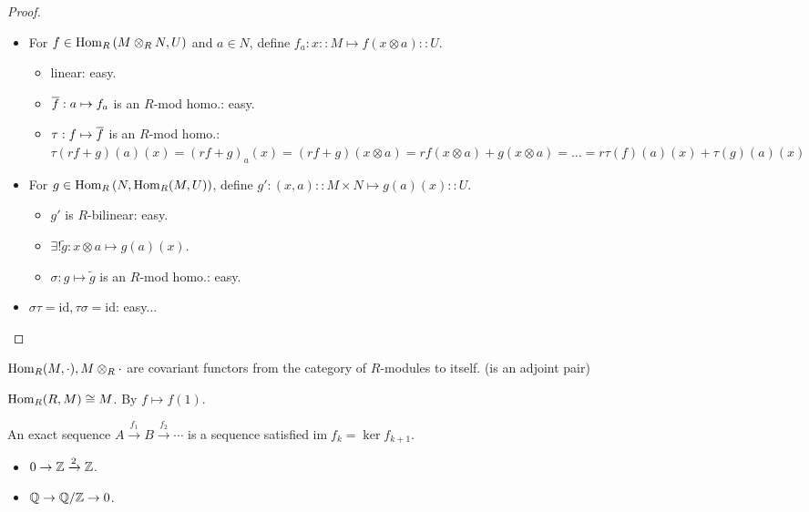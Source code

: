 \begin{proof} \mbox{}
  \begin{itemize}
    \item For $f \in \operatorname{Hom}_R\left(M \otimes_R N, U\right)$ and $a \in N$,
      define $f_a: x :: M \mapsto f(x \otimes a) :: U$.
      \begin{itemize}
        \item linear: easy.
        \item $\overline{f}: a \mapsto f_a$ is an $R$-mod homo.: easy.
        \item $\tau: f \mapsto \overline{f}$ is an $R$-mod homo.:
          $\tau(rf+g)(a)(x) = (rf+g)_a(x) = (rf+g)(x\otimes a)
          = rf(x\otimes a) + g(x\otimes a) = \dots
          = r\tau(f)(a)(x) + \tau(g)(a)(x)$
      \end{itemize}
    \item For $g \in \operatorname{Hom}_R\left(N, \operatorname{Hom}_R(M, U)\right)$,
      define $g': (x, a) :: M \times N \mapsto g(a)(x) :: U$.
      \begin{itemize}
        \item $g'$ is $R$-bilinear: easy.
        \item $\exists! \tilde{g}: x\otimes a \mapsto g(a)(x)$.
        \item $\sigma: g\mapsto \tilde{g}$ is an $R$-mod homo.: easy.
      \end{itemize}
    \item $\sigma \tau = \text{id}, \tau \sigma = \text{id}$: easy...
      \qedhere
  \end{itemize}
\end{proof}

\begin{exercise}
  $\operatorname{Hom}_R(M, \cdot), M \otimes_R \cdot$ are covariant functors from the
  category of $R$-modules to itself.
  (is an adjoint pair)
\end{exercise}

\begin{fact}
  $\operatorname{Hom}_R(R, M) \cong M$. By $f \mapsto f(1)$.
\end{fact}

\begin{definition}
  An exact sequence $A \xrightarrow{f_1} B \xrightarrow{f_2} \cdots$ is 
  a sequence satisfied $\text{im}\; f_k = \ker f_{k+1}$.
\end{definition}

\begin{itemize}
  \item $0 \to \mathbb{Z} \xrightarrow{2} \mathbb{Z}$.
  \item $\mathbb{Q} \to {\mathbb{Q}}/{\mathbb{Z}} \to 0$.
\end{itemize}

